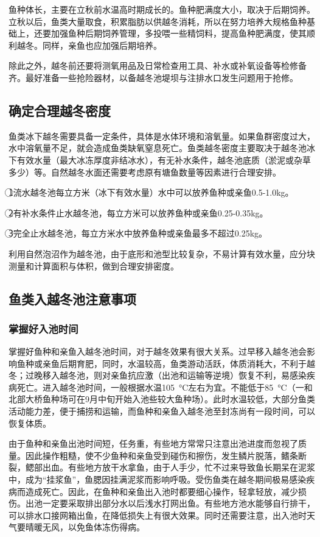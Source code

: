 \documentclass{ctexbook}
\begin{document}
鱼种体长，主要在立秋前水温高时期成长的。鱼种肥满度大小，取决于后期饲养。立秋以后，鱼类大量取食，积累脂肪以供越冬消耗，所以在努力培养大规格鱼种基础上，还要加强鱼种后期饲养管理，多投喂一些精饲料，提高鱼种肥满度，使其顺利越冬。同样，亲鱼也应加强后期培养。

除此之外，越冬前还要将测氧用品及日常检查用工具、补水或补氧设备等检修备齐。最好准备一些抢险器材，以备越冬池堤坝与注排水口发生问题用于抢修。
\subsection{确定合理越冬密度}
鱼类冰下越冬需要具备一定条件，具体是水体环境和溶氧量。如果鱼群密度过大，水中溶氧量不足，就会造成鱼类缺氧窒息死亡。鱼类越冬密度主要取决于越冬池冰下有效水量（最大冰冻厚度非结冰水），有无补水条件，越冬池底质（淤泥或杂草多少）等。自然越冬水面还需要考虑原有塘鱼数量等因素进行合理安排。

\textcircled{1}流水越冬池每立方米（冰下有效水量）水中可以放养鱼种或亲鱼0.5-1.0kg。

\textcircled{2}有补水条件止水越冬池，每立方米可以放养鱼种或亲鱼0.25-0.35kg。

\textcircled{3}完全止水越冬池，每立方米水中放养鱼种或亲鱼最多不超过0.25kg。

利用自然泡沼作为越冬池，由于底形和池型比较复杂，不易计算有效水量，应分块测量和计算面积与体积，做到合理安排密度。
\subsection{鱼类入越冬池注意事项}
\subsubsection{掌握好入池时间}
掌握好鱼种和亲鱼入越冬池时间，对于越冬效果有很大关系。过早移入越冬池会影响鱼种或亲鱼后期育肥，同时，水温较高，鱼类游动活跃，体质消耗大，不利于越冬；过晚移入越冬池，则对亲鱼抗应激（出池和运输等逆境）恢复不利，易感染疾病死亡。进入越冬池时间，一般根据水温10\SI{5}{\degreeCelsius}左右为宜。不能低于8\SI{5}{\degreeCelsius}（一和北部大桥鱼种场可在9月中旬开始入池些较大鱼种场）。此时水温较低，大部分鱼类活动能力差，便于捕捞和运输，而鱼种和亲鱼入越冬池至封冻尚有一段时间，可以恢复体质。

由于鱼种和亲鱼出池时间短，任务重，有些地方常常只注意出池进度而忽视了质量。因此操作粗糙，使不少鱼种和亲鱼受到碰伤和擦伤，发生鳞片脱落，鳍条断裂，鳃部出血。有些地方放干水拿鱼，由于人手少，忙不过来导致鱼长期呆在泥浆中，成为“挂浆鱼”，鱼腮因挂满泥浆而影响呼吸。受伤鱼类在越冬期间极易感染疾病而造成死亡。因此，在鱼种和亲鱼出入池时都要细心操作，轻拿轻放，减少损伤。出池一定要采取排出部分水以后浅水打网出鱼。有些地方池水能够自行排干，可以排水口接网箱出鱼，在降低损失上有很大效果。同时还需要注意，出入池时天气要晴暖无风，以免鱼体冻伤得病。
\end{document}
